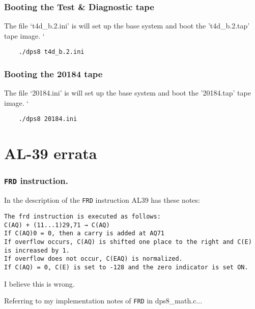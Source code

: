 \documentclass[notitlepage]{report}
\begin{document}
\section{Booting the Test \& Diagnostic tape}

The file `t4d\_b.2.ini' is will set up the base system and boot the 't4d\_b.2.tap' tape image.
`
\begin{lstlisting}
	./dps8 t4d_b.2.ini
\end{lstlisting}

\section{Booting the 20184 tape}

The file `20184.ini' is will set up the base system and boot the '20184.tap' tape image.
`
\begin{lstlisting}
	./dps8 20184.ini
\end{lstlisting}

\part{AL-39 errata}

\section{\texttt{FRD} instruction.}

In the description of the \texttt{FRD} instruction AL39 has these notes:

\begin{verbatim}
The frd instruction is executed as follows:
C(AQ) + (11...1)29,71 → C(AQ)
If C(AQ)0 = 0, then a carry is added at AQ71
If overflow occurs, C(AQ) is shifted one place to the right and C(E) is increased by 1.
If overflow does not occur, C(EAQ) is normalized.
If C(AQ) = 0, C(E) is set to -128 and the zero indicator is set ON.
\end{verbatim}

I believe this is wrong.


Referring to my implementation notes of \texttt{FRD} in dps8\_math.c...
\end{document}
